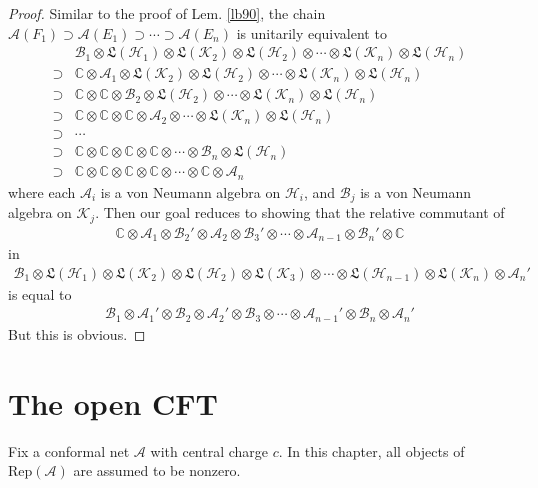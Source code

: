 \documentclass[11pt,b5paper,notitlepage]{article}
\theoremstyle{definition}
\theoremstyle{plain}
\newcommand{\fk}{\mathfrak}
\newcommand{\scr}{\mathscr}
\newcommand{\RepA}{\mathrm{Rep}(\mathcal A)}
\newcommand{\Cbb}{\mathbb C}
\newcommand{\MA}{\mathcal A}
\newcommand{\MH}{\mathcal H}
\newcommand{\MK}{\mathcal K}
\newcommand{\SA}{\scr A}
\newcommand{\SB}{\scr B}
\numberwithin{equation}{section}
\begin{document}
\begin{proof}
Similar to the proof of Lem. \ref{lb90}, the chain $\MA(F_1)\supset\MA(E_1)\supset\cdots\supset\MA(E_n)$ is unitarily equivalent to
\begin{align*}
&\SB_1\otimes\fk L(\MH_1)\otimes\fk L(\MK_2)\otimes\fk L(\MH_2)\otimes\cdots\otimes\fk L(\MK_n)\otimes\fk L(\MH_n)\\
\supset&\Cbb\otimes\SA_1\otimes\fk L(\MK_2)\otimes\fk L(\MH_2)\otimes\cdots\otimes\fk L(\MK_n)\otimes\fk L(\MH_n)\\
\supset& \Cbb\otimes\Cbb\otimes\SB_2\otimes\fk L(\MH_2)\otimes\cdots\otimes\fk L(\MK_n)\otimes\fk L(\MH_n)\\
\supset& \Cbb\otimes\Cbb\otimes\Cbb\otimes\SA_2\otimes\cdots\otimes\fk L(\MK_n)\otimes\fk L(\MH_n)\\
\supset&\cdots\\
\supset&\Cbb\otimes\Cbb\otimes\Cbb\otimes\Cbb\otimes\cdots\otimes\SB_n\otimes\fk L(\MH_n)\\
\supset&\Cbb\otimes\Cbb\otimes\Cbb\otimes\Cbb\otimes\cdots\otimes\Cbb\otimes\SA_n
\end{align*}
where each $\SA_i$ is a von Neumann algebra on $\MH_i$, and $\SB_j$ is a von Neumann algebra on $\MK_j$. Then our goal reduces to showing that the relative commutant of
\begin{align*}
\Cbb\otimes\SA_1\otimes\SB_2'\otimes\SA_2\otimes\SB_3'\otimes\cdots\otimes \SA_{n-1}\otimes\SB_n'\otimes\Cbb
\end{align*}
in
\begin{align*}
\SB_1\otimes\fk L(\MH_1)\otimes\fk L(\MK_2)\otimes\fk L(\MH_2)\otimes\fk L(\MK_3)\otimes\cdots\otimes \fk L(\MH_{n-1})\otimes\fk L(\MK_n)\otimes\SA_n'
\end{align*}
is equal to
\begin{align*}
\SB_1\otimes\SA_1'\otimes\SB_2\otimes\SA_2'\otimes\SB_3\otimes\cdots\otimes \SA_{n-1}'\otimes\SB_n\otimes\SA_n'
\end{align*}
But this is obvious.
\end{proof}





\section{The open CFT}\label{lb150}

Fix a conformal net $\MA$ with central charge $c$. In this chapter, all objects of $\RepA$ are assumed to be nonzero.
\end{document}

